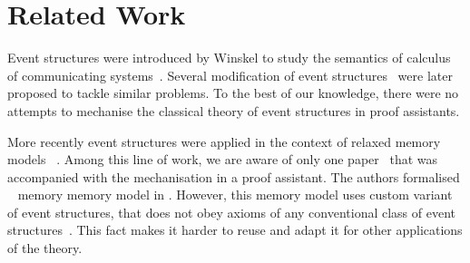 \section{Related Work}

Event structures were introduced by Winskel to study the semantics of 
calculus of communicating systems~\cite{Winskel:82}. 
Several modification of event structures~\cite{Langerak:91, Boudol-Castellani:1991}
were later proposed to tackle similar problems.  
To the best of our knowledge, there were no attempts 
to mechanise the classical theory of event structures 
in proof assistants. 
 
More recently event structures were applied 
in the context of relaxed memory models~%
\cite{Jeffrey-Riely:LICS16, PichonPharabod-Sewell:POPL16, Chakraborty-Vafeiadis:POPL19, Moiseenko-al:ECOOP20}.
Among this line of work, we are aware of only one paper~\cite{Moiseenko-al:ECOOP20}
that was accompanied with the mechanisation in a proof assistant. 
The authors formalised \weakestmo~\cite{Chakraborty-Vafeiadis:POPL19} 
memory memory model in \coq. However, this memory model uses 
custom variant of event structures, that does not 
obey axioms of any conventional class of 
event structures~\cite{Winskel:82, Langerak:91, Boudol-Castellani:1991}. 
This fact makes it harder to reuse and adapt it 
for other applications of the theory. 

